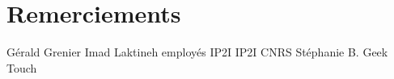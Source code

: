 \chapter*{Remerciements}

Gérald Grenier
Imad Laktineh
employés IP2I
IP2I
CNRS
Stéphanie B. Geek Touch
